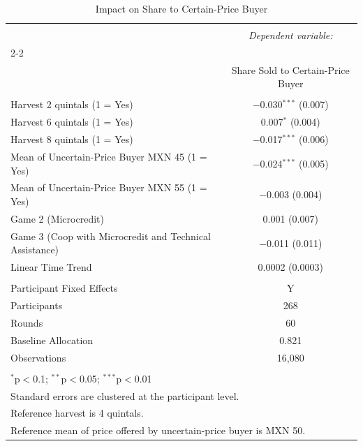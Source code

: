 
\begin{table}[!htbp] \centering 
  \caption{Impact on Share to Certain-Price Buyer} 
  \label{round_level_outcomes_overall} 
\begin{tabular}{@{\extracolsep{5pt}}lc} 
\\[-1.8ex]\hline 
\hline \\[-1.8ex] 
 & \multicolumn{1}{c}{\textit{Dependent variable:}} \\ 
\cline{2-2} 
\\[-1.8ex] & Share Sold to Certain-Price Buyer \\ 
\hline \\[-1.8ex] 
 Harvest 2 quintals (1 = Yes) & $-$0.030$^{***}$ (0.007) \\ 
  Harvest 6 quintals (1 = Yes) & 0.007$^{*}$ (0.004) \\ 
  Harvest 8 quintals (1 = Yes) & $-$0.017$^{***}$ (0.006) \\ 
  Mean of Uncertain-Price Buyer MXN 45 (1 = Yes) & $-$0.024$^{***}$ (0.005) \\ 
  Mean of Uncertain-Price Buyer MXN 55 (1 = Yes) & $-$0.003 (0.004) \\ 
  Game 2 (Microcredit) & 0.001 (0.007) \\ 
  Game 3 (Coop with Microcredit and Technical Assistance) & $-$0.011 (0.011) \\ 
  Linear Time Trend & 0.0002 (0.0003) \\ 
 \hline \\[-1.8ex] 
Participant Fixed Effects & Y \\ 
Participants & 268 \\ 
Rounds & 60 \\ 
Baseline Allocation & 0.821 \\ 
Observations & 16,080 \\ 
\hline 
\hline \\[-1.8ex] 
\multicolumn{2}{l}{$^{*}$p$<$0.1; $^{**}$p$<$0.05; $^{***}$p$<$0.01} \\ 
\multicolumn{2}{l}{Standard errors are clustered at the participant level.} \\ 
\multicolumn{2}{l}{Reference harvest is 4 quintals.} \\ 
\multicolumn{2}{l}{Reference mean of price offered by uncertain-price buyer is MXN 50.} \\ 
\end{tabular} 
\end{table} 
